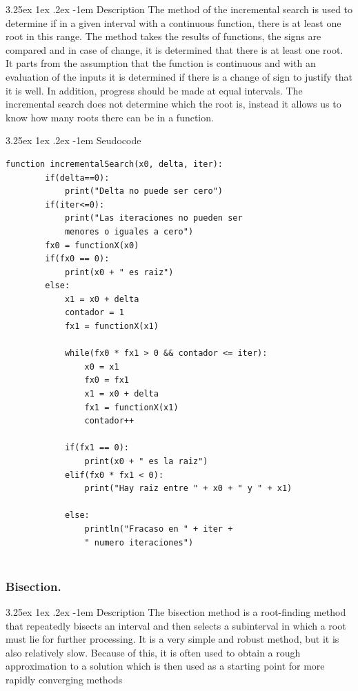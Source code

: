 \documentclass{article}
\makeatletter
\renewcommand\paragraph{\@startsection{paragraph}{5}{\z@}%
  {3.25ex \@plus1ex \@minus.2ex}%
  {-1em}%
  {\normalfont\normalsize\bfseries}}
\makeatother
\begin{document}
\paragraph{Description}
\hfill \break
The method of the incremental search is used to determine if in a given interval with a continuous function, there is at least one root in this range. The method takes the results of functions, the signs are compared and in case of change, it is determined that there is at least one root.
It parts from the assumption that the function is continuous and with an evaluation of the inputs it is determined if there is a change of sign to justify that it is well. In addition, progress should be made at equal intervals.
The incremental search does not determine which the root is, instead it allows us to know how many roots there can be in a function.

\paragraph{Seudocode}
\hfill \break
\begin{lstlisting}
function incrementalSearch(x0, delta, iter):
		if(delta==0):
			print("Delta no puede ser cero")
		if(iter<=0):
			print("Las iteraciones no pueden ser 
			menores o iguales a cero")
		fx0 = functionX(x0)
		if(fx0 == 0):
			print(x0 + " es raiz")
		else:
			x1 = x0 + delta
			contador = 1
			fx1 = functionX(x1)
			
			while(fx0 * fx1 > 0 && contador <= iter):
				x0 = x1
				fx0 = fx1
				x1 = x0 + delta
				fx1 = functionX(x1)
				contador++
			
			if(fx1 == 0):
				print(x0 + " es la raiz")
			elif(fx0 * fx1 < 0):
				print("Hay raiz entre " + x0 + " y " + x1)
				
			else:
				println("Fracaso en " + iter + 
				" numero iteraciones")
			
\end{lstlisting}

\subsubsection{Bisection.}

\paragraph{Description}
\hfill \break
The bisection method is a root-finding method that repeatedly bisects an interval and then selects a subinterval in which a root must lie for further processing. It is a very simple and robust method, but it is also relatively slow. Because of this, it is often used to obtain a rough approximation to a solution which is then used as a starting point for more rapidly converging methods
\end{document}
